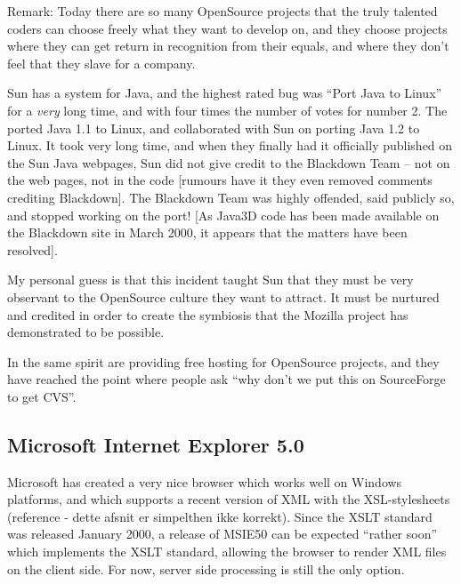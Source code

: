 Remark: Today there are so many OpenSource projects that the truly
talented coders can choose freely what they want to develop on, and
they choose projects where they can get return in recognition from
their equals, and where they don't feel that they slave for a company.

Sun has a
 system for Java, and the highest rated
bug was ``Port Java to Linux'' for a \textit{very} long time, and with
four times the number of votes for number 2.  The
 ported Java 1.1 to
Linux, and collaborated with Sun on porting Java 1.2 to Linux.  It
took very long time, and when they finally had it officially published
on the Sun Java webpages, Sun did not give credit to the Blackdown
Team -- not on the web pages, not in the code [rumours have it they
even removed comments crediting Blackdown].  The Blackdown Team was
highly offended, said publicly so, and stopped working on the port!
[As Java3D code has been made available on the Blackdown site in
March 2000, it appears that the matters have been resolved].

My personal guess is that this incident taught Sun that they must be
very observant to the OpenSource culture they want to attract.  It
must be nurtured and credited in order to create the symbiosis that
the Mozilla project has demonstrated to be possible.

In the same spirit 
are providing free hosting for OpenSource projects, and they have
reached the point where people ask ``why don't we put this on
SourceForge to get CVS''.

\subsection{Microsoft Internet Explorer 5.0}
\label{sec:microsoft-internet-explorer}

Microsoft has created a very nice browser which works well on Windows
platforms, and which supports a recent version of XML with the
XSL-stylesheets (\textsf{reference - dette afsnit er simpelthen ikke korrekt)}.  Since the XSLT standard was
released January 2000, a release of MSIE50 can be expected ``rather
soon'' which implements the XSLT standard, allowing the browser to
render XML files on the client side.  For now, server side processing
is still the only option.

